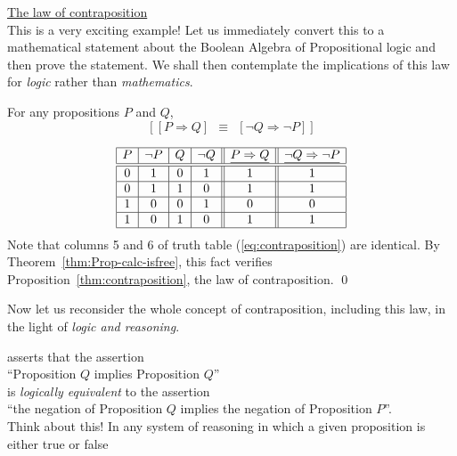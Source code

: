 \bigskip

\noindent 
\underline{\small\sf The law of contraposition} \\
This is a very exciting example!  Let us immediately convert this to a
mathematical statement about the Boolean Algebra of Propositional
logic and then prove the statement.  We shall then contemplate the
implications of this law for {\em logic} rather than {\em mathematics}.

\begin{prop}
\label{thm:contraposition}
For any propositions $P$ and $Q$,
\[  \left[ [ P \Rightarrow Q ] \ \ \equiv \ \ [ \neg Q
    \Rightarrow \neg P ] \right]
\]
\end{prop}

\begin{equation}
\label{eq:contraposition}
\begin{array}{|c|c|c|c||c||c|}
\hline
P & \neg P & Q & \neg Q & \underline{P \Rightarrow Q}
 & \underline{\neg Q \Rightarrow \neg P} \\
\hline
\hline
0 & 1 & 0 & 1 & 1 & 1 \\
\hline
0 & 1 & 1 & 0 & 1 & 1 \\
\hline
1 & 0 & 0 & 1 & 0 & 0 \\
\hline
1 & 0 & 1 & 0 & 1 & 1 \\
\hline
\end{array}
\end{equation}
Note that columns 5 and 6 of truth table (\ref{eq:contraposition}) are
identical.  By Theorem~\ref{thm:Prop-calc-isfree}, this fact verifies
Proposition~\ref{thm:contraposition}, the law of contraposition.
\qed

\smallskip

Now let us reconsider the whole concept of contraposition, including
this law, in the light of {\em logic and reasoning}.

 asserts that the assertion \\
\hspace*{.35in}
``Proposition $Q$ implies Proposition $Q$'' \\
is {\em logically equivalent} to the assertion \\
\hspace*{.35in}
``the negation of Proposition $Q$ implies the negation of Proposition
$P$''.  \\
Think about this!  In any system of reasoning in which a given
proposition is either {\sc true} or {\sc false} 





